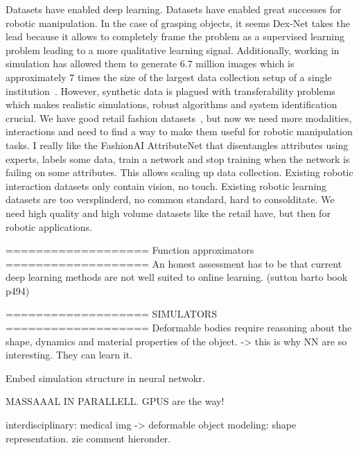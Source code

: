 \documentclass[\home/main.tex]{subfiles}
\begin{document}
Datasets have enabled deep learning. Datasets have enabled great successes for robotic manipulation. In the case of grasping objects, it seems Dex-Net takes the lead because it allows to completely frame the problem as a supervised learning problem leading to a more qualitative learning signal. Additionally, working in simulation has allowed them to generate $6.7$ million images which is approximately $7$ times the size of the largest data collection setup of a single institution~\autocite{Levine2016}. However, synthetic data is plagued with transferability problems which makes realistic simulations, robust algorithms and system identification crucial. 
We have good retail fashion datasets~\autocite{DeepFashion, DeepFashion2, FashionAI}, but now we need more modalities, interactions and need to find a way to make them useful for robotic manipulation tasks. 
I really like the FashionAI AttributeNet that disentangles attributes using experts, labels some data, train a network and stop training when the network is failing on some attributes. This allows scaling up data collection.
Existing robotic interaction datasets only contain vision, no touch. 
Existing robotic learning datasets are too versplinderd, no common standard, hard to consolditate. 
We need high quality and high volume datasets like the retail have, but then for robotic applications. 


===================
Function approximators 
===================
An honest assessment has to be that current deep learning methods are not well suited to online learning. (sutton barto book p494)

===================
SIMULATORS 
===================
Deformable bodies require reasoning about the shape, dynamics and material properties of the object. -> this is why NN are so interesting. They can learn it.

Embed simulation structure in neural netwokr. 

MASSAAAL IN PARALLELL. GPUS are the way!

interdisciplinary: medical img -> deformable object modeling: shape representation. zie comment hieronder.
\end{document}
